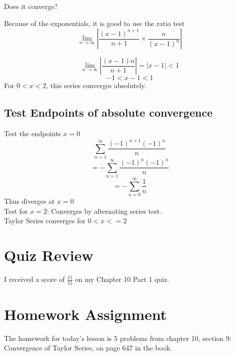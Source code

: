 \documentclass[12pt, letterpaper]{article}
\begin{document}
Does it converge?

Because of the exponentials, it is good to use the ratio test
\[
	\lim_{n\to\infty} \left| \frac{(x-1)^{n+1}}{n+1}\times\frac{n}{(x-1)^n} \right|
\]

\[
	\lim_{n\to\infty} \left| \frac{(x-1)n}{n+1}
	\right| = \left| x-1 \right| < 1
\]
\[ 
	-1 < x-1 < 1
\]
For $0<x<2$, this series converges absolutely.


\subsection{Test Endpoints of absolute convergence}%
Test the endpoints $x=0$
\[
	\sum_{n=1}^{\infty} \frac{(-1)^{n+1}(-1)^n}{n}
\]
\[
	= -\sum_{n=1}^{\infty} \frac{(-1)^n(-1)^n}{n}
\]
\[
	= -\sum_{n=0}^{\infty}\frac{1}{n}
\]
Thus diverges at $x=0$\\

Test for $x=2$: Converges by alternating series test.\\

Taylor Series converges for $0<x<=2$



\section{Quiz Review}

I received a score of $\frac{15}{15}$ on my Chapter 10 Part 1 quiz.


\section{Homework Assignment}

The homework for today's lesson is 5 problems from chapter 10, section 9:
Convergence of Taylor Series, on page 647 in the book.
\end{document}
